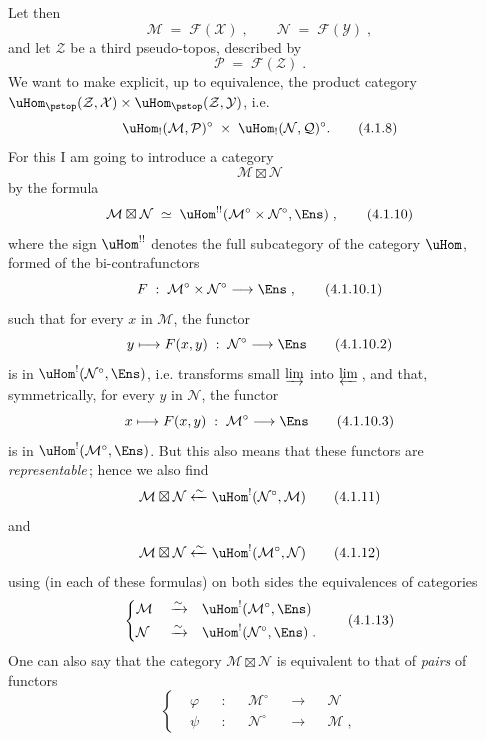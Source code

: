 Let then
\[
\mathcal{M} \;=\; \mathcal{F}(\mathcal{X})\;, \qquad \mathcal{N} \;=\; \mathcal{F}(\mathcal{Y})\;,
\tag*{(4.1.6)}
\]
and let $\mathcal{Z}$ be a third pseudo-topos, described by
\[
\mathcal{P} \;=\; \mathcal{F}(\mathcal{Z})\;.
\tag*{(4.1.7)}
\]
We want to make explicit, up to equivalence, the product category $\uHom_{\pstop}(\mathcal{Z},\mathcal{X})\times\uHom_{\pstop}(\mathcal{Z},\mathcal{Y})$, i.e.
\[
\uHom_!(\mathcal{M},\mathcal{P})^\circ \;\times\; \uHom_!(\mathcal{N},\mathcal{Q})^\circ.
\tag*{(4.1.8)}
\]%
For this I am going to introduce a category
\[
\mathcal{M}\boxtimes\mathcal{N}
\tag*{(4.1.9)}
\]
by the formula
\[
\mathcal{M}\boxtimes\mathcal{N} \;\simeq\; \uHom^{!!}(\mathcal{M}^\circ\times\mathcal{N}^\circ,\Ens)\;,
\tag*{(4.1.10)}
\]
where the sign $\uHom^{!!}$ denotes the full subcategory of the category $\uHom$, formed of the bi-contrafunctors %
\[
F \;:\; \mathcal{M}^\circ\times\mathcal{N}^\circ \longrightarrow \Ens\;,
\tag*{(4.1.10.1)}
\]
such that for every $x$ in $\mathcal{M}$, the functor
\[
y \longmapsto F(x,y) \;:\; \mathcal{N}^\circ \longrightarrow \Ens
\tag*{(4.1.10.2)}
\]
is in $\uHom^!(\mathcal{N}^\circ,\Ens)$, i.e. transforms small $\varinjlim$ into $\varprojlim$\,, and that, symmetrically, for every $y$ in $\mathcal{N}$, the functor
\[
x \longmapsto F(x,y) \;:\; \mathcal{M}^\circ \longrightarrow \Ens
\tag*{(4.1.10.3)}
\]
is in $\uHom^!(\mathcal{M}^\circ,\Ens)$. But this also means that these functors are \textit{representable}\,; hence we also find
\[
\mathcal{M}\boxtimes\mathcal{N} \xleftarrow{\sim} \uHom^!(\mathcal{N}^\circ,\mathcal{M})
\tag*{(4.1.11)}
\]
and
\[
\mathcal{M}\boxtimes\mathcal{N} \xleftarrow{\sim} \uHom^!(\mathcal{M}^\circ,\mathcal{N})
\tag*{(4.1.12)}
\]
using (in each of these formulas) on both sides the equivalences of categories
\[
\left\{
\begin{aligned}
&\mathcal{M} &&\xrightarrow{\sim} &&\uHom^!(\mathcal{M}^\circ,\Ens)\\
&\mathcal{N} &&\xrightarrow{\sim} &&\uHom^!(\mathcal{N}^\circ,\Ens)\;.
\end{aligned}
\right.
\tag*{(4.1.13)}
\]
One can also say that the category $\mathcal{M}\boxtimes\mathcal{N}$ is equivalent to that of \textit{pairs} of functors
\[
\left\{
\begin{aligned}
&\varphi &&: &&\mathcal{M}^\circ &&\longrightarrow &&\mathcal{N}\\
&\psi &&: &&\mathcal{N}^\circ &&\longrightarrow &&\mathcal{M}\;,
\end{aligned}
\right.
\tag*{(4.1.14)}
\]
